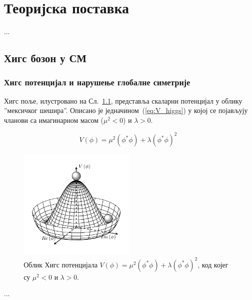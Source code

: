 
\chapter{Теоријска поставка} %

\label{Теоријска поставка} %


...

\section{Хигс бозон у СМ}

\subsection{Хигс потенцијал и нарушење глобалне симетрије}

Хигс поље, илустровано на Сл.~\ref{fig:mexican_hat}, представља скаларни потенцијал у облику ''мексичког шешира''. Описано је једначином~(\ref{eq:V_higgs}) у којој се појављују чланови са имагинарном масом ($\mu^2 < 0$) и $\lambda > 0$.

\begin{equation}
V(\phi) = \mu^2(\phi^*\phi) + \lambda(\phi^*\phi)^2
\label{eq:V_higgs}
\end{equation}

\begin{figure}[H]
  \centering
	\includegraphics[width=0.505\textwidth]{texImages/mexican_hat.pdf}
	\caption{Облик Хигс потенцијала $V(\phi) = \mu^2(\phi^*\phi) + \lambda(\phi^*\phi)^2$, код којег су $\mu^2 < 0$ и $\lambda > 0$.}
	\label{fig:mexican_hat}
\end{figure}

...
